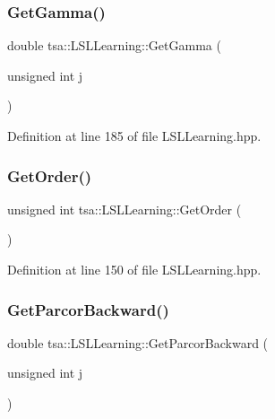 \subsubsection{\texorpdfstring{Get\+Gamma()}{GetGamma()}}
{\footnotesize\ttfamily double tsa\+::\+L\+S\+L\+Learning\+::\+Get\+Gamma (\begin{DoxyParamCaption}\item[{unsigned int}]{j }\end{DoxyParamCaption})\hspace{0.3cm}{\ttfamily [inline]}}



Definition at line 185 of file L\+S\+L\+Learning.\+hpp.

\mbox{\label{classtsa_1_1_l_s_l_learning_ae442a68a9f2f455d86ce56342288381c}} 
\subsubsection{\texorpdfstring{Get\+Order()}{GetOrder()}}
{\footnotesize\ttfamily unsigned int tsa\+::\+L\+S\+L\+Learning\+::\+Get\+Order (\begin{DoxyParamCaption}{ }\end{DoxyParamCaption})\hspace{0.3cm}{\ttfamily [inline]}}



Definition at line 150 of file L\+S\+L\+Learning.\+hpp.

\mbox{\label{classtsa_1_1_l_s_l_learning_a276e9d2206da6c6ac89cdca1cd6c4560}} 
\subsubsection{\texorpdfstring{Get\+Parcor\+Backward()}{GetParcorBackward()}}
{\footnotesize\ttfamily double tsa\+::\+L\+S\+L\+Learning\+::\+Get\+Parcor\+Backward (\begin{DoxyParamCaption}\item[{unsigned int}]{j }\end{DoxyParamCaption})\hspace{0.3cm}{\ttfamily [inline]}}



